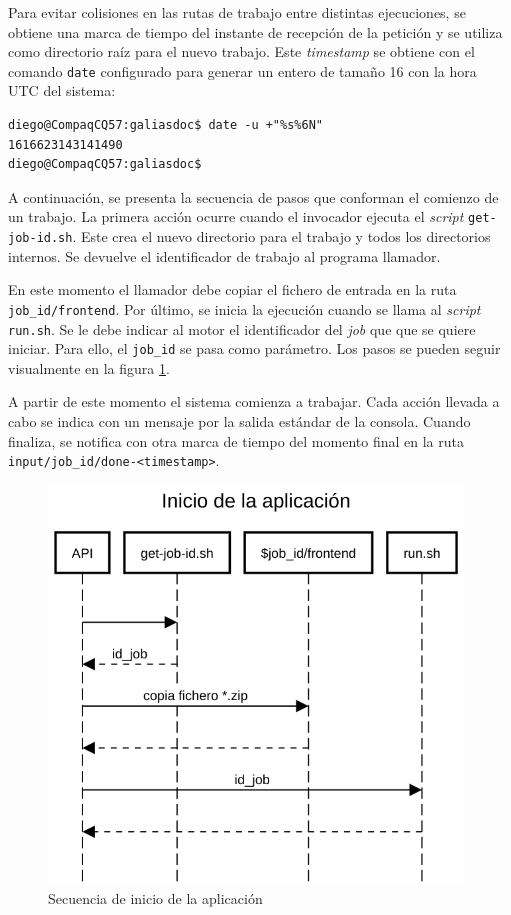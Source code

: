 Para evitar colisiones en las rutas de trabajo entre distintas ejecuciones, se obtiene una marca de tiempo del instante de recepción de la petición y se utiliza como directorio raíz para el nuevo trabajo. Este \emph{timestamp} se obtiene con el comando \verb|date| configurado para generar un entero de tamaño 16 con la hora UTC del sistema:

\begin{verbatim}
diego@CompaqCQ57:galiasdoc$ date -u +"%s%6N"
1616623143141490
diego@CompaqCQ57:galiasdoc$
\end{verbatim}

A continuación, se presenta la secuencia de pasos que conforman el comienzo de un trabajo. La primera acción ocurre cuando el invocador ejecuta el \emph{script} \verb|get-job-id.sh|. Este crea el nuevo directorio para el trabajo y todos los directorios internos. Se devuelve el identificador de trabajo al programa llamador.

En este momento el llamador debe copiar el fichero de entrada en la ruta \verb|job_id/frontend|. Por último, se inicia la ejecución cuando se llama al \emph{script} \verb|run.sh|. Se le debe indicar al motor el identificador del \emph{job} que que se quiere iniciar. Para ello, el \verb|job_id| se pasa como parámetro. Los pasos se pueden seguir visualmente en la figura \ref{fig:inicio-aplicacion}.

A partir de este momento el sistema comienza a trabajar. Cada acción llevada a cabo se indica con un mensaje por la salida estándar de la consola. Cuando finaliza, se notifica con otra marca de tiempo del momento final en la ruta \verb|input/job_id/done-<timestamp>|.

\begin{figure}[hp!]
  \centering
  \includegraphics[width=11cm]{imaxes/inicio-aplicacion.png}
  \caption{Secuencia de inicio de la aplicación}
  \label{fig:inicio-aplicacion}
\end{figure}


